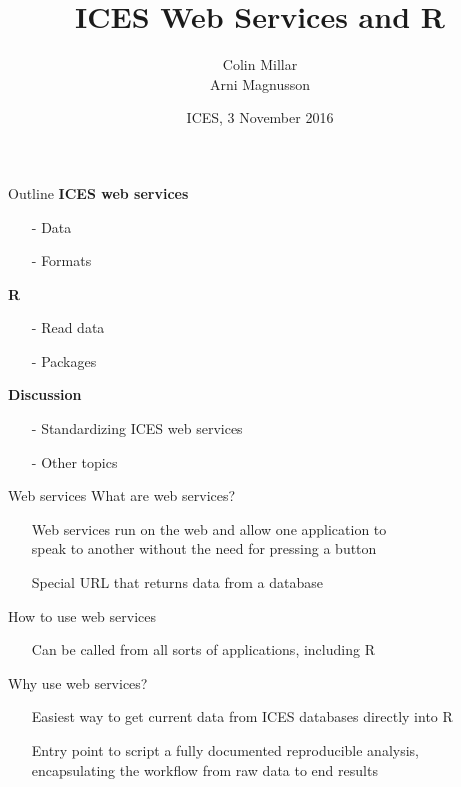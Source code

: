\documentclass[aspectratio=169]{beamer}
\title{ICES Web Services and R}
\author{Colin Millar\\[0.5ex]Arni Magnusson}
\date{ICES, 3 November 2016}
\begin{document}
\begin{frame}
  \titlepage
\end{frame}

\begin{frame}{Outline}\small
  \textbf{ICES web services}\\[-1ex]
  \begin{itemize}
    \item[-] Data
    \item[-] Formats\\[4ex]
  \end{itemize}
  \textbf{R}\\[-1.5ex]
  \begin{itemize}
    \item[-] Read data
    \item[-] Packages\\[4.5ex]
  \end{itemize}
  \textbf{Discussion}\\[-1ex]
  \begin{itemize}
    \item[-] Standardizing ICES web services
    \item[-] Other topics\\[3ex]
  \end{itemize}
\end{frame}


\begin{frame}{Web services}\small
  {\green What are web services?}\\[-1ex]
  \begin{itemize}\footnotesize
    \item[] Web services run on the web and allow one application to\\
    speak to another without the need for pressing a button\\[1.5ex]
    \item[] Special URL that returns data from a database\\[4.5ex]
  \end{itemize}
  {\green How to use web services}\\[-1ex]
  \begin{itemize}\normalfont\footnotesize
    \item[] Can be called from all sorts of applications, including R\\[4.5ex]
  \end{itemize}
  {\green Why use web services?}\\[-1ex]
  \begin{itemize}\normalfont\footnotesize
    \item[] Easiest way to get current data from ICES databases directly into
    R\\[1.5ex]
    \item[] Entry point to script a fully documented reproducible analysis,\\
    encapsulating the workflow from raw data to end results\\[4.5ex]
  \end{itemize}
\end{frame}
\end{document}
